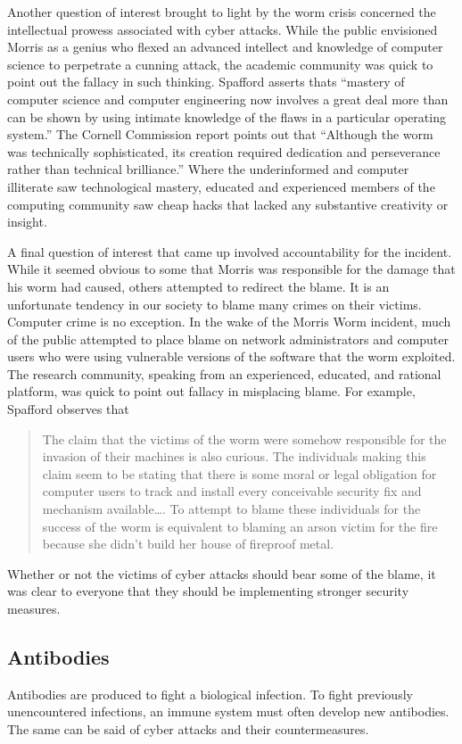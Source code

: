 Another question of interest brought to light by the worm crisis concerned the
intellectual prowess associated with cyber attacks. While the public 
envisioned Morris as a genius who flexed an advanced intellect and
knowledge of computer science to perpetrate a cunning attack, the
academic community was quick to point out the fallacy in such thinking.
Spafford\cite{spafford_crisis_1989} asserts thats ``mastery of computer science
and computer engineering now involves a great deal more than can be shown by using
intimate knowledge of the flaws in a particular operating system.'' The Cornell
Commission\cite{eisenberg_cornell_1989} report points out that ``Although the
worm was technically sophisticated, its creation required dedication and
perseverance rather than technical brilliance.'' Where the underinformed and
computer illiterate saw technological mastery, educated and experienced members
of the computing community saw cheap hacks that lacked any substantive
creativity or insight.

A final question of interest that came up involved accountability for the
incident. While it seemed obvious to some that Morris was responsible for the
damage that his worm had caused, others attempted to redirect the blame. It is
an unfortunate tendency in our society to blame many crimes
on their victims. Computer crime is no exception. In the wake of the Morris
Worm incident, much of the public attempted to place blame on network
administrators and computer users who were using vulnerable versions of the
software that the worm exploited. The research community, speaking from an
experienced, educated, and rational platform, was quick to point out fallacy in
misplacing blame.
For example, Spafford\cite{spafford_crisis_1989} observes that
\begin{quote}
The claim that the victims of the worm were somehow responsible for the
invasion of their machines is also curious. The individuals making this claim
seem to be stating that there is some moral or legal obligation for computer
users to track and install every conceivable security fix and mechanism
available\ldots.
To attempt to blame these individuals for the success of the worm is equivalent
to blaming an arson victim for the fire because she didn't build her house of
fireproof metal.
\end{quote}
Whether or not the victims of cyber attacks should bear some of the blame, it
was clear to everyone that they should be implementing stronger security
measures.

\subsection*{Antibodies}
Antibodies are produced to fight a biological infection. To fight previously
unencountered infections, an immune system must often develop new antibodies.
The same can be said of cyber attacks and their countermeasures. 

